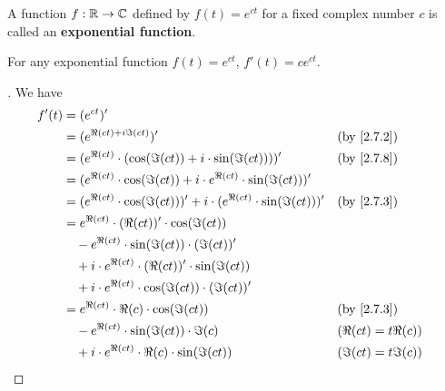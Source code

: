 \begin{defn}\label{2.7.9}
  A function \(f : \mathbb{R} \to \mathbb{C}\) defined by \(f(t) = e^{ct}\) for a fixed complex number \(c\) is called an \textbf{exponential function}.
\end{defn}

\begin{thm}\label{2.29}
  For any exponential function \(f(t) = e^{ct}\), \(f'(t) = c e^{ct}\).
\end{thm}

\begin{proof}[]
  We have
  \begin{align*}
    f'(t) & = (e^{ct})'                                                                                                 \\
          & = (e^{\Re(ct) + i \Im(ct)})'                                                      &  & \by{2.7.2}           \\
          & = (e^{\Re(ct)} \cdot (\cos(\Im(ct)) + i \cdot \sin(\Im(ct))))'                    &  & \by{2.7.8}           \\
          & = (e^{\Re(ct)} \cdot \cos(\Im(ct)) + i \cdot e^{\Re(ct)} \cdot \sin(\Im(ct)))'                              \\
          & = (e^{\Re(ct)} \cdot \cos(\Im(ct)))' + i \cdot (e^{\Re(ct)} \cdot \sin(\Im(ct)))' &  & \by{2.7.3}           \\
          & = e^{\Re(ct)} \cdot (\Re(ct))' \cdot \cos(\Im(ct))                                                          \\
          & \quad - e^{\Re(ct)} \cdot \sin(\Im(ct)) \cdot (\Im(ct))'                                                    \\
          & \quad + i \cdot e^{\Re(ct)} \cdot (\Re(ct))' \cdot \sin(\Im(ct))                                            \\
          & \quad + i \cdot e^{\Re(ct)} \cdot \cos(\Im(ct)) \cdot (\Im(ct))'                                            \\
          & = e^{\Re(ct)} \cdot \Re(c) \cdot \cos(\Im(ct))                                    &  & \by{2.7.3}           \\
          & \quad - e^{\Re(ct)} \cdot \sin(\Im(ct)) \cdot \Im(c)                              &  & (\Re(ct) = t \Re(c)) \\
          & \quad + i \cdot e^{\Re(ct)} \cdot \Re(c) \cdot \sin(\Im(ct))                      &  & (\Im(ct) = t \Im(c)) \\

\end{align*}
\end{proof}
